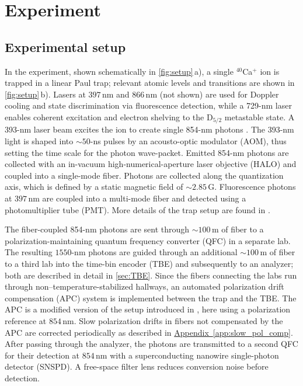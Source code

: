 \documentclass[reprint, superscriptaddress, longbibliography, floatfix, twocolumn, nofootinbib, amsmath, amssymb, aps, showkeys]{revtex4-2}
\newcommand{\appref}[1]{\hyperref[#1]{Appendix~\ref*{#1}}}
\begin{document}
\section{Experiment}\label{sec:Experiment}

\subsection{Experimental setup}

In the experiment, shown schematically in \autoref{fig:setup}\,a), a single $^{40}$Ca$^+$ ion is trapped in a linear Paul trap; relevant atomic levels and transitions are shown in \autoref{fig:setup}\,b). Lasers at $397\,$nm and $866\,$nm (not shown) are used for Doppler cooling and state discrimination via fluorescence detection, while a 729-nm laser enables coherent excitation and electron shelving to the D$_{5/2}$ metastable state. A 393-nm laser beam excites the ion to create single 854-nm photons \cite{Baumgart_2026}. The 393-nm light is shaped into $\sim 50$-ns pulses by an acousto-optic modulator (AOM), thus setting the time scale for the photon wave-packet. Emitted 854-nm photons are collected with an in-vacuum high-numerical-aperture laser objective (HALO) and coupled into a single-mode fiber. Photons are collected along the quantization axis, which is defined by a static magnetic field of $\sim 2.85\,$G. Fluorescence photons at $397\,$nm are coupled into a multi-mode fiber and detected using a photomultiplier tube (PMT). More details of the trap setup are found in \cite{Bergerhoff_2024}.

The fiber-coupled 854-nm photons are sent through $\sim100\,$m of fiber to a polarization-maintaining quantum frequency converter (QFC) \cite{Arenskoetter_2023} in a separate lab. The resulting $1550$-nm photons are guided through an additional $\sim100\,$m of fiber to a third lab into the time-bin encoder (TBE) and subsequently to an analyzer; both are described in detail in \autoref{sec:TBE}. Since the fibers connecting the labs run through non–temperature-stabilized hallways, an automated polarization drift compensation (APC) system is implemented between the trap and the TBE. The APC is a modified version of the setup introduced in \cite{Kucera_2024}, here using a polarization reference at $854\,$nm. Slow polarization drifts in fibers not compensated by the APC are corrected periodically as described in \appref{app:slow_pol_comp}. After passing through the analyzer, the photons are transmitted to a second QFC \cite{Bauer_2023} for their detection at $854\,$nm with a superconducting nanowire single-photon detector (SNSPD). A free-space filter lens reduces conversion noise before detection.
\end{document}
